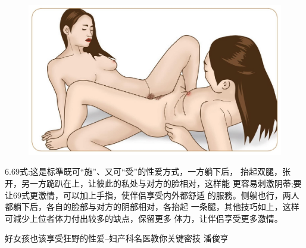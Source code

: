 \documentclass[12pt,UTF8]{ctexbook}
\begin{document}
\begin{figure}[htbp]
	\centering
	\includegraphics[width=0.7\linewidth]{12}
	\caption{}
	\label{fig:1}
\end{figure}

6.69式:这是标準既可“施”、又可“受”的性爱方式，一方躺下后，
抬起双腿，张开，另一方跪趴在上，让彼此的私处与对方的脸相对，这样能
更容易刺激阴蒂;要让69式更激情，可以加上手指，使伴侣享受内外都舒适
的服務。侧躺也行，两人都躺下后，各自的脸部与对方的阴部相对，各抬起
一条腿，其他技巧如上，这样可減少上位者体力付出较多的缺点，保留更多
体力，让伴侣享受更多激情。



\backmatter

好女孩也该享受狂野的性爱--妇产科名医教你关键密技  潘俊亨
\end{document}
